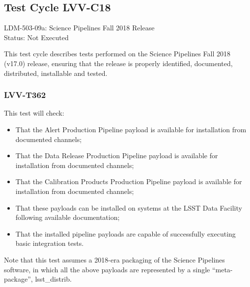 \documentclass[DM,lsstdraft,STR,toc]{lsstdoc}
\providecommand{\tightlist}{
  \setlength{\itemsep}{0pt}\setlength{\parskip}{0pt}}
\begin{document}
\subsection{Test Cycle LVV-C18}

LDM-503-09a: Science Pipelines Fall 2018 Release\\
Status: Not Executed


This test cycle describes tests performed on the Science Pipelines Fall
2018 (v17.0) release, ensuring that the release is properly identified,
documented, distributed, installable and tested.



\subsubsection{LVV-T362}

This test will check:

\begin{itemize}
\tightlist
\item
  That the Alert Production Pipeline payload is available for
  installation from documented channels;
\item
  That the Data Release Production Pipeline payload is available for
  installation from documented channels;
\item
  That the Calibration Products Production Pipeline payload is available
  for installation from documented channels;
\item
  That these payloads can be installed on systems at the LSST Data
  Facility following available documentation;
\item
  That the installed pipeline payloads are capable of successfully
  executing basic integration tests.
\end{itemize}

Note that this test assumes a 2018-era packaging of the Science
Pipelines software, in which all the above payloads are represented by a
single ``meta-package'', lsst\_distrib.
\end{document}
